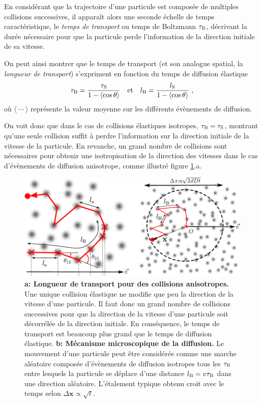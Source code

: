En considérant que la trajectoire d'une particule est composée de multiples collisions successives, il apparaît alors une seconde échelle de temps caractéristique, le \emph{temps de transport} ou temps de Boltzmann $\tau_{\mathrm{B}}$, décrivant la durée nécessaire pour que la particule perde l'information de la direction initiale de sa vitesse. 


On peut ainsi montrer que le temps de transport (et son analogue spatial, la \emph{longueur de transport}) s'expriment en fonction du temps de diffusion élastique \citep{akkermans2007mesoscopic}
\begin{equation}
\tau_{\mathrm{B}}=\frac{\tau_{\mathrm{S}}}{1-\left\langle\cos{\theta}\right\rangle} \quad \text{et} \quad l_{\mathrm{B}}=\frac{l_{\mathrm{S}}}{1-\left\langle\cos{\theta}\right\rangle} \text{ ,}
\label{eq:definition_taub}
\end{equation}
où $\langle\:\cdots\:\rangle$ représente la valeur moyenne sur les différents évènements de diffusion.

On voit donc que dans le cas de collisions élastiques isotropes, $\tau_{\mathrm{B}}=\tau_{\mathrm{S}}$, montrant qu'une seule collision suffit à perdre l'information sur la direction initiale de la vitesse de la particule. En revanche, un grand nombre de collisions sont nécessaires pour obtenir une isotropisation de la direction des vitesses dans le cas d'évènements de diffusion anisotrope, comme illustré figure \ref{fig:diffusion_classique}.a.


\begin{figure}
\centering
\includegraphics[width=\textwidth]{Fig/Localisation/diffusion_classique.pdf}
\caption{\textbf{a: Longueur de transport pour des collisions anisotropes.} Une unique collision élastique ne modifie que peu la direction de la vitesse d'une particule. Il faut donc un grand nombre de collisions successives pour que la direction de la vitesse d'une particule soit décorrélée de la direction initiale. En conséquence, le temps de transport est beaucoup plus grand que le temps de diffusion élastique. \textbf{b: Mécanisme microscopique de la diffusion.} Le mouvement d'une particule peut être considérée comme une marche aléatoire composée d'évènements de diffusion isotropes tous les $\tau_{\mathrm{B}}$ entre lesquels la particule se déplace d'une distance $l_{\mathrm{B}}=v \tau_{\mathrm{B}}$ dans une direction aléatoire. L'étalement typique obtenu croit avec le temps selon $\Delta \mathbf{x} \propto \sqrt{t}$.}
\label{fig:diffusion_classique}
\end{figure}






